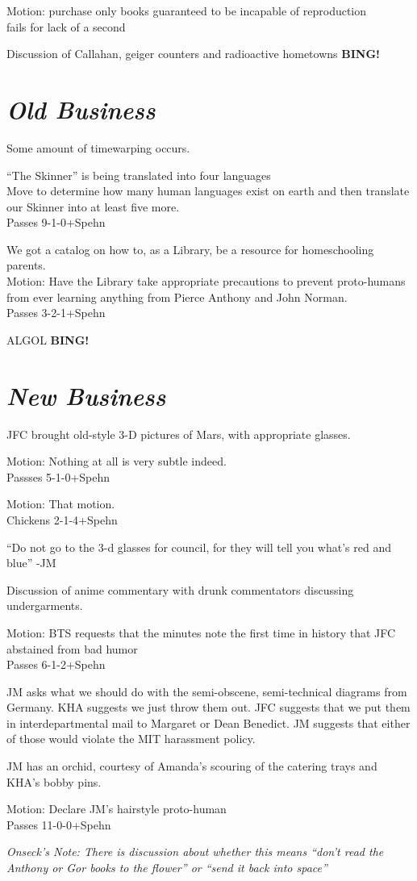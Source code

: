 \documentclass[10pt]{article}
\newcommand{\bing}{{\bf BING!} }
\newcommand{\goto}[1]{\bing \vskip 12pt \section*{{\em{#1}}}}
\begin{document}
Motion: purchase only books guaranteed to be incapable of reproduction\\
fails for lack of a second

Discussion of Callahan, geiger counters and radioactive hometowns
\goto{Old Business}

Some amount of timewarping occurs.

``The Skinner'' is being translated into four languages\\
Move to determine how many human languages exist on earth and then
translate our Skinner into at least five more.\\
Passes 9-1-0+Spehn

We got a catalog on how to, as a Library, be a resource for
homeschooling parents.\\
Motion: Have the Library take appropriate precautions to prevent proto-humans from ever learning anything from Pierce Anthony and John Norman.\\
Passes 3-2-1+Spehn

ALGOL
\goto{New Business}
JFC brought old-style 3-D pictures of Mars, with appropriate glasses.

Motion: Nothing at all is very subtle indeed.\\
Passses 5-1-0+Spehn

Motion: That motion.\\
Chickens 2-1-4+Spehn

``Do not go to the 3-d glasses for council, for they will tell you
what's red and blue'' -JM

Discussion of anime commentary with drunk commentators discussing
undergarments.

Motion: BTS requests that the minutes note the first time in history that JFC abstained from bad humor\\
Passes 6-1-2+Spehn

JM asks what we should do with the semi-obscene, semi-technical
diagrams from Germany. KHA suggests we just throw them out. JFC
suggests that we put them in interdepartmental mail to Margaret or
Dean Benedict. JM suggests that either of those would violate the MIT
harassment policy.

JM has an orchid, courtesy of Amanda's scouring of the catering trays
and KHA's bobby pins.  

Motion: Declare JM's hairstyle proto-human\\
Passes 11-0-0+Spehn

\emph{Onseck's Note: There is discussion about whether this means ``don't read the Anthony or Gor books to the flower'' or ``send it back into space''}
\end{document}
